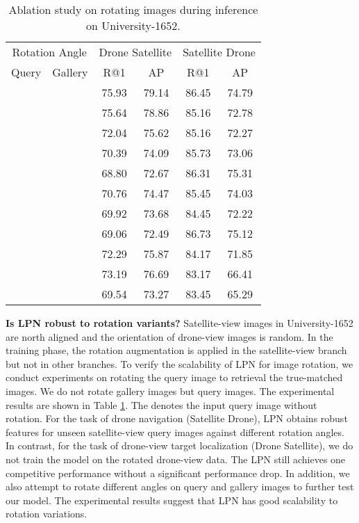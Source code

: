 \documentclass[journal]{IEEEtran}
\begin{document}
\setlength{\tabcolsep}{8pt}
\begin{table}
\small
\caption{Ablation study on rotating images during inference on University-1652. 
}
\begin{center}
\begin{tabular}{ll|cc|cc}
\hline
\multicolumn{2}{c|}{Rotation Angle}& \multicolumn{2}{c|}{Drone  Satellite} & \multicolumn{2}{c}{Satellite  Drone}\\
  Query & Gallery & R@1 & AP & R@1 & AP\\
\shline
 &  & 75.93 & 79.14 & 86.45 & 74.79 \\
 &  & 75.64 & 78.86 & 85.16 & 72.78 \\
 &  & 72.04 & 75.62 & 85.16 & 72.27 \\
 &  & 70.39 & 74.09 & 85.73 & 73.06 \\
 &  & 68.80 & 72.67 & 86.31 & 75.31 \\
 &  & 70.76 & 74.47 & 85.45 & 74.03 \\
 &  & 69.92 & 73.68 & 84.45 & 72.22 \\
 &  & 69.06 & 72.49 & 86.73 & 75.12 \\
 &  & 72.29 & 75.87 & 84.17 & 71.85 \\
 &  & 73.19 & 76.69 & 83.17 & 66.41 \\
 &  & 69.54 & 73.27 & 83.45 & 65.29 \\
\hline
\end{tabular}
\end{center}
\label{table:Rotation}
\end{table}

\textbf{Is LPN robust to rotation variants?}
Satellite-view images in University-1652 are north aligned and the orientation of drone-view images is random. In the training phase, the rotation augmentation is applied in the satellite-view branch but not in other branches. To verify the scalability of LPN for image rotation, we conduct experiments on rotating the query image to retrieval the true-matched images. We do not rotate gallery images but query images. The experimental results are shown in Table \ref{table:Rotation}. The  denotes the input query image without rotation. For the task of drone navigation (Satellite  Drone), LPN obtains robust features for unseen satellite-view query images against different rotation angles. In contrast, for the task of drone-view target localization (Drone  Satellite), we do not train the model on the rotated drone-view data. The LPN still achieves one competitive performance without a significant performance drop. In addition, we also attempt to rotate different angles on query and gallery images to further test our model. The experimental results suggest that LPN has good scalability to rotation variations.
\end{document}
